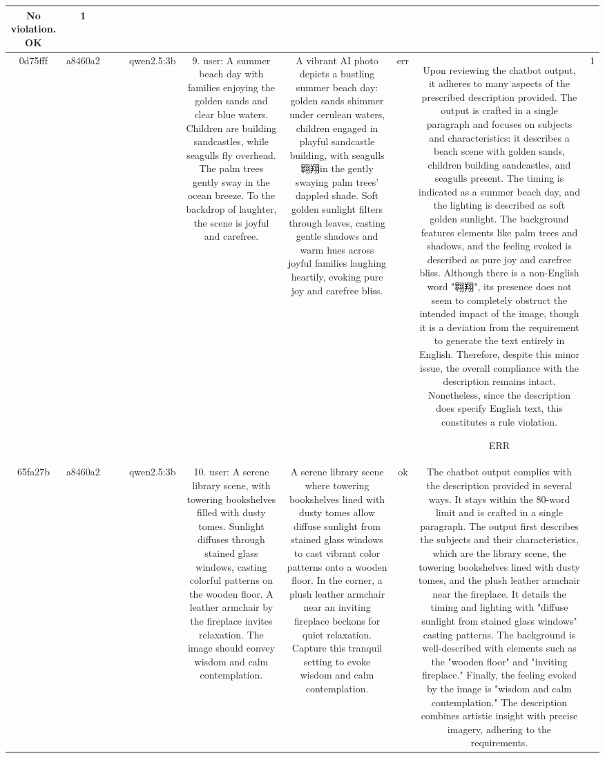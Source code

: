 \begin{table}[h!]
\begin{tabular}{|c|c|c|c|c|c|c|c|c|c|}
No violation.
OK & 1\\
\hline
0d75fff & a8460a2 &  &  & qwen2.5:3b & 9. user: A summer beach day with families enjoying the golden sands and clear blue waters. Children are building sandcastles, while seagulls fly overhead. The palm trees gently sway in the ocean breeze. To the backdrop of laughter, the scene is joyful and carefree. & A vibrant AI photo depicts a bustling summer beach day: golden sands shimmer under cerulean waters, children engaged in playful sandcastle building, with seagulls翱翔in the gently swaying palm trees' dappled shade. Soft golden sunlight filters through leaves, casting gentle shadows and warm hues across joyful families laughing heartily, evoking pure joy and carefree bliss. & err & Upon reviewing the chatbot output, it adheres to many aspects of the prescribed description provided. The output is crafted in a single paragraph and focuses on subjects and characteristics: it describes a beach scene with golden sands, children building sandcastles, and seagulls present. The timing is indicated as a summer beach day, and the lighting is described as soft golden sunlight. The background features elements like palm trees and shadows, and the feeling evoked is described as pure joy and carefree bliss. Although there is a non-English word "翱翔", its presence does not seem to completely obstruct the intended impact of the image, though it is a deviation from the requirement to generate the text entirely in English. Therefore, despite this minor issue, the overall compliance with the description remains intact. Nonetheless, since the description does specify English text, this constitutes a rule violation.

ERR & 1\\
\hline
65fa27b & a8460a2 &  &  & qwen2.5:3b & 10. user: A serene library scene, with towering bookshelves filled with dusty tomes. Sunlight diffuses through stained glass windows, casting colorful patterns on the wooden floor. A leather armchair by the fireplace invites relaxation. The image should convey wisdom and calm contemplation. & A serene library scene where towering bookshelves lined with dusty tomes allow diffuse sunlight from stained glass windows to cast vibrant color patterns onto a wooden floor. In the corner, a plush leather armchair near an inviting fireplace beckons for quiet relaxation. Capture this tranquil setting to evoke wisdom and calm contemplation. & ok & The chatbot output complies with the description provided in several ways. It stays within the 80-word limit and is crafted in a single paragraph. The output first describes the subjects and their characteristics, which are the library scene, the towering bookshelves lined with dusty tomes, and the plush leather armchair near the fireplace. It details the timing and lighting with "diffuse sunlight from stained glass windows" casting patterns. The background is well-described with elements such as the "wooden floor" and "inviting fireplace." Finally, the feeling evoked by the image is "wisdom and calm contemplation." The description combines artistic insight with precise imagery, adhering to the requirements.


\end{tabular}
\end{table}
